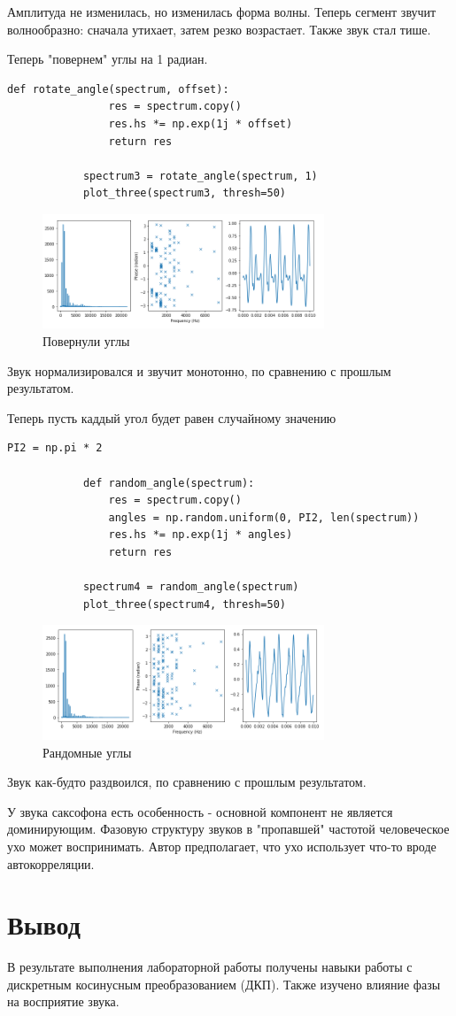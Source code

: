 \documentclass[a4paper,12pt]{article}
\begin{document}
\begin{enumerate}
		Амплитуда не изменилась, но изменилась форма волны. Теперь сегмент звучит волнообразно: сначала утихает, затем резко возрастает. Также звук стал тише.
		
		Теперь "повернем" углы на 1 радиан.
		\begin{lstlisting}[caption=Повернули углы]
			def rotate_angle(spectrum, offset):
				res = spectrum.copy()
				res.hs *= np.exp(1j * offset)
				return res
			
			spectrum3 = rotate_angle(spectrum, 1)
			plot_three(spectrum3, thresh=50)
		\end{lstlisting}
		\begin{figure}[H]
			\centering
			\includegraphics[width=0.75\textwidth]{3_3.png}
			\caption{Повернули углы}
			\label{fig:3.3}
		\end{figure}
		
		Звук нормализировался и звучит монотонно, по сравнению с прошлым результатом.
		
		Теперь пусть каддый угол будет равен случайному значению
		\begin{lstlisting}[caption=Рандомные углы]
			PI2 = np.pi * 2
			
			def random_angle(spectrum):
				res = spectrum.copy()
				angles = np.random.uniform(0, PI2, len(spectrum))
				res.hs *= np.exp(1j * angles)
				return res
			
			spectrum4 = random_angle(spectrum)
			plot_three(spectrum4, thresh=50)
		\end{lstlisting}
		\begin{figure}[H]
			\centering
			\includegraphics[width=0.75\textwidth]{3_4.png}
			\caption{Рандомные углы}
			\label{fig:3.4}
		\end{figure}
	
		Звук как-будто раздвоился, по сравнению с прошлым результатом.
		
		У звука саксофона есть особенность - основной компонент не является доминирующим. Фазовую структуру звуков в "пропавшей" частотой человеческое ухо может воспринимать. Автор предполагает, что ухо использует что-то вроде автокорреляции.
		
		
	\end{enumerate}
	\newpage
	
	
	\section {Вывод}
	
	В результате выполнения лабораторной работы получены навыки работы с дискретным косинусным преобразованием (ДКП). Также изучено влияние фазы на восприятие звука.
	

					
\end{document}
